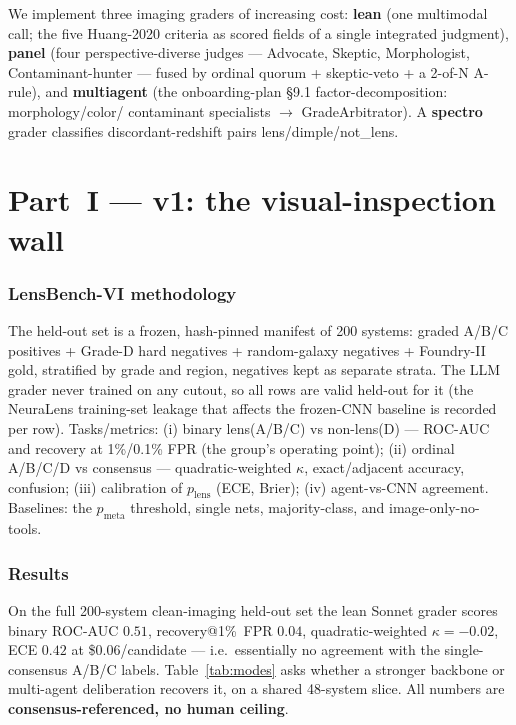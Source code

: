 \documentclass[11pt,letterpaper]{article}
\newcommand{\plens}{\ensuremath{p_{\mathrm{lens}}}}
\newcommand{\pmeta}{\ensuremath{p_{\mathrm{meta}}}}
\newcommand{\Nheldout}{200}          %
\newcommand{\leanAUC}{0.51}          %
\newcommand{\leanRecOne}{0.04}
\newcommand{\leanQWK}{-0.02}
\newcommand{\leanECE}{0.42}
\newcommand{\leanCost}{0.06}
\begin{document}
We implement three imaging graders of increasing cost: \textbf{lean} (one multimodal call;
the five Huang-2020 criteria as scored fields of a single integrated judgment),
\textbf{panel} (four perspective-diverse judges --- Advocate, Skeptic, Morphologist,
Contaminant-hunter --- fused by ordinal quorum + skeptic-veto + a 2-of-N A-rule), and
\textbf{multiagent} (the onboarding-plan \S9.1 factor-decomposition: morphology/color/
contaminant specialists $\rightarrow$ GradeArbitrator). A \textbf{spectro} grader classifies
discordant-redshift pairs lens/dimple/not\_lens.

\part{Part~I --- v1: the visual-inspection wall}

\section{LensBench-VI methodology}
\label{sec:bench}
The held-out set is a frozen, hash-pinned manifest of \Nheldout{} systems: graded A/B/C
positives + Grade-D hard negatives + random-galaxy negatives + Foundry-II gold, stratified
by grade and region, negatives kept as separate strata. The LLM grader never trained on any
cutout, so all rows are valid held-out for it (the NeuraLens training-set leakage that
affects the frozen-CNN baseline is recorded per row). Tasks/metrics: (i) binary lens(A/B/C)
vs non-lens(D) --- ROC-AUC and recovery at 1\%/0.1\% FPR (the group's operating point);
(ii) ordinal A/B/C/D vs consensus --- quadratic-weighted $\kappa$, exact/adjacent accuracy,
confusion; (iii) calibration of \plens{} (ECE, Brier); (iv) agent-vs-CNN agreement.
Baselines: the \pmeta{} threshold, single nets, majority-class, and image-only-no-tools.

\section{Results}
\label{sec:results}
On the full \Nheldout{}-system clean-imaging held-out set the lean Sonnet grader scores
binary ROC-AUC $\leanAUC$, recovery@1\%~FPR $\leanRecOne$, quadratic-weighted
$\kappa=\leanQWK$, ECE $\leanECE$ at \$$\leanCost$/candidate --- i.e.\ essentially no
agreement with the single-consensus A/B/C labels. Table~\ref{tab:modes} asks whether a
stronger backbone or multi-agent deliberation recovers it, on a shared 48-system slice.
All numbers are \textbf{consensus-referenced, no human ceiling}.
\end{document}
